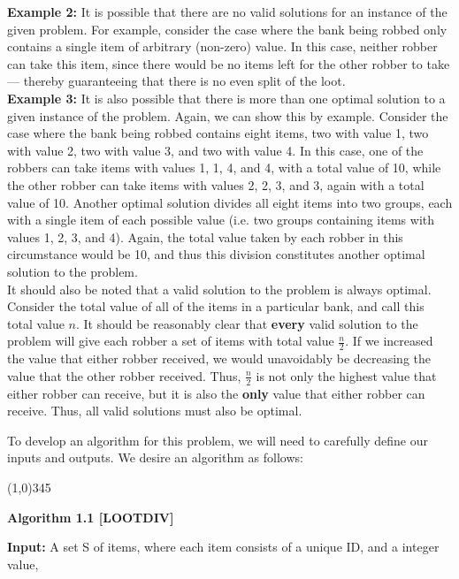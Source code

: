 \documentclass{article}
\begin{document}
\textbf{Example 2:}  It is possible that there are no valid solutions for an instance of the given problem. For example, consider the case where the bank being robbed only contains a single item of arbitrary (non-zero) value. In this case, neither robber can take this item, since there would be no items left for the other robber to take --- thereby guaranteeing that there is no even split of the loot.  \\

\textbf{Example 3:} It is also possible that there is more than one optimal solution to a given instance of the problem. Again, we can show this by example. Consider the case where the bank being robbed contains eight items, two with value 1, two with value 2, two with value 3, and two with value 4. In this case, one of the robbers can take items with values 1, 1, 4, and 4, with a total value of 10, while the other robber can take items with values 2, 2, 3, and 3, again with a total value of 10. Another optimal solution divides all eight items into two groups, each with a single item of each possible value (i.e. two groups containing items with values 1, 2, 3, and 4). Again, the total value taken by each robber in this circumstance would be 10, and thus this division constitutes another optimal solution to the problem. \\

It should also be noted that a valid solution to the problem is always optimal. Consider the total value of all of the items in a particular bank, and call this total value $n$. It should be reasonably clear that \textbf{every} valid solution to the problem will give each robber a set of items with total value $\frac{n}{2}$. If we increased the value that either robber received, we would unavoidably be decreasing the value that the other robber received. Thus, $\frac{n}{2}$ is not only the highest value that either robber can receive, but it is also the \textbf{only} value that either robber can receive. Thus, all valid solutions must also be optimal.

To develop an algorithm for this problem, we will need to carefully define our inputs and outputs.  We desire an algorithm as follows:

\begin{center}
\line(1,0){345}
\end{center}
\textbf{Algorithm 1.1 [LOOTDIV]}

\textbf{Input:} A set S of items, where each item consists of a unique ID, and a integer value,
\end{document}

